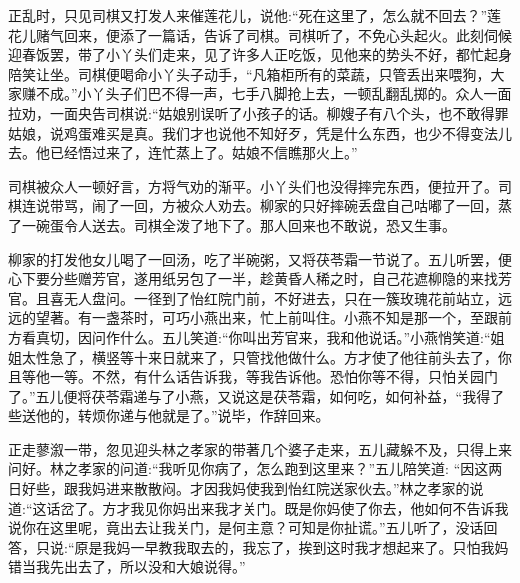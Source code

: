 \begin{parag}
    正乱时，只见司棋又打发人来催莲花儿，说他:“死在这里了，怎么就不回去？”莲花儿赌气回来，便添了一篇话，告诉了司棋。司棋听了，不免心头起火。此刻伺候迎春饭罢，带了小丫头们走来，见了许多人正吃饭，见他来的势头不好，都忙起身陪笑让坐。司棋便喝命小丫头子动手，“凡箱柜所有的菜蔬，只管丢出来喂狗，大家赚不成。”小丫头子们巴不得一声，七手八脚抢上去，一顿乱翻乱掷的。众人一面拉劝，一面央告司棋说:“姑娘别误听了小孩子的话。柳嫂子有八个头，也不敢得罪姑娘，说鸡蛋难买是真。我们才也说他不知好歹，凭是什么东西，也少不得变法儿去。他已经悟过来了，连忙蒸上了。姑娘不信瞧那火上。”
\end{parag}


\begin{parag}
    司棋被众人一顿好言，方将气劝的渐平。小丫头们也没得摔完东西，便拉开了。司棋连说带骂，闹了一回，方被众人劝去。柳家的只好摔碗丢盘自己咕嘟了一回，蒸了一碗蛋令人送去。司棋全泼了地下了。那人回来也不敢说，恐又生事。
\end{parag}


\begin{parag}
    柳家的打发他女儿喝了一回汤，吃了半碗粥，又将茯苓霜一节说了。五儿听罢，便心下要分些赠芳官，遂用纸另包了一半，趁黄昏人稀之时，自己花遮柳隐的来找芳官。且喜无人盘问。一径到了怡红院门前，不好进去，只在一簇玫瑰花前站立，远远的望著。有一盏茶时，可巧小燕出来，忙上前叫住。小燕不知是那一个，至跟前方看真切，因问作什么。五儿笑道:“你叫出芳官来，我和他说话。”小燕悄笑道:“姐姐太性急了，横竖等十来日就来了，只管找他做什么。方才使了他往前头去了，你且等他一等。不然，有什么话告诉我，等我告诉他。恐怕你等不得，只怕关园门了。”五儿便将茯苓霜递与了小燕，又说这是茯苓霜，如何吃，如何补益，“我得了些送他的，转烦你递与他就是了。”说毕，作辞回来。
\end{parag}


\begin{parag}
    正走蓼溆一带，忽见迎头林之孝家的带著几个婆子走来，五儿藏躲不及，只得上来问好。林之孝家的问道:“我听见你病了，怎么跑到这里来？”五儿陪笑道: “因这两日好些，跟我妈进来散散闷。才因我妈使我到怡红院送家伙去。”林之孝家的说道:“这话岔了。方才我见你妈出来我才关门。既是你妈使了你去，他如何不告诉我说你在这里呢，竟出去让我关门，是何主意？可知是你扯谎。”五儿听了，没话回答，只说:“原是我妈一早教我取去的，我忘了，挨到这时我才想起来了。只怕我妈错当我先出去了，所以没和大娘说得。”
\end{parag}


